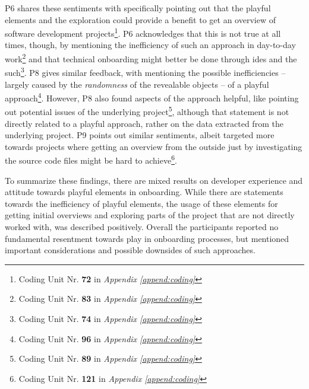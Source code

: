P6 shares these sentiments with specifically pointing out that the playful elements and the exploration could provide a benefit to get an overview of software development projects\footnote{Coding Unit Nr. \textbf{72} in \textit{Appendix \ref{append:coding}}}. P6 acknowledges that this is not true at all times, though, by mentioning the inefficiency of such an approach in day-to-day work\footnote{Coding Unit Nr. \textbf{83} in \textit{Appendix \ref{append:coding}}} and that technical onboarding might better be done through \gls{ide}s and the such\footnote{Coding Unit Nr. \textbf{74} in \textit{Appendix \ref{append:coding}}}. P8 gives similar feedback, with mentioning the possible inefficiencies -- largely caused by the \textit{randomness} of the revealable objects -- of a playful approach\footnote{Coding Unit Nr. \textbf{96} in \textit{Appendix \ref{append:coding}}}. However, P8 also found aspects of the approach helpful, like pointing out potential issues of the underlying project\footnote{Coding Unit Nr. \textbf{89} in \textit{Appendix \ref{append:coding}}}, although that statement is not directly related to a playful approach, rather on the data extracted from the underlying project. P9 points out similar sentiments, albeit targeted more towards projects where getting an overview from the outside just by investigating the source code files might be hard to achieve\footnote{Coding Unit Nr. \textbf{121} in \textit{Appendix \ref{append:coding}}}.

To summarize these findings, there are mixed results on developer experience and attitude towards playful elements in onboarding. While there are statements towards the inefficiency of playful elements, the usage of these elements for getting initial overviews and exploring parts of the project that are not directly worked with, was described positively. Overall the participants reported no fundamental resentment towards play in onboarding processes, but mentioned important considerations and possible downsides of such approaches.

